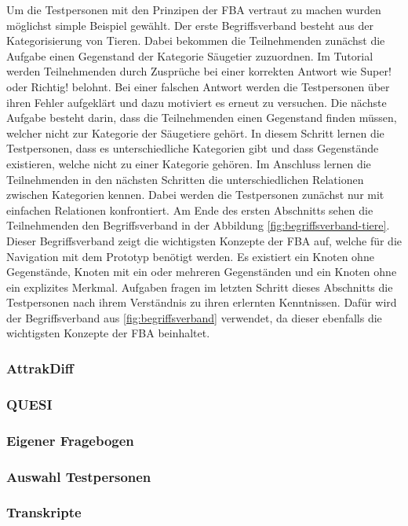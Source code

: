 Um die Testpersonen mit den Prinzipen der \ac{FBA} vertraut zu machen wurden möglichst simple Beispiel gewählt.
Der erste Begriffsverband besteht aus der Kategorisierung von Tieren.
Dabei bekommen die Teilnehmenden zunächst die Aufgabe einen Gegenstand der Kategorie Säugetier zuzuordnen.
Im Tutorial werden Teilnehmenden durch Zusprüche bei einer korrekten Antwort wie \glqq Super!\grqq{} oder \glqq Richtig!\grqq{} belohnt.
Bei einer falschen Antwort werden die Testpersonen über ihren Fehler aufgeklärt und dazu motiviert es erneut zu versuchen.
Die nächste Aufgabe besteht darin, dass die Teilnehmenden einen Gegenstand finden müssen, welcher nicht zur Kategorie der Säugetiere gehört.
In diesem Schritt lernen die Testpersonen, dass es unterschiedliche Kategorien gibt und dass Gegenstände existieren, welche nicht zu einer Kategorie gehören.
Im Anschluss lernen die Teilnehmenden in den nächsten Schritten die unterschiedlichen Relationen zwischen Kategorien kennen.
Dabei werden die Testpersonen zunächst nur mit einfachen Relationen konfrontiert.
Am Ende des ersten Abschnitts sehen die Teilnehmenden den Begriffsverband in der Abbildung \ref{fig:begriffsverband-tiere}.
Dieser Begriffsverband zeigt die wichtigsten Konzepte der \ac{FBA} auf, welche für die Navigation mit dem Prototyp benötigt werden.
Es existiert ein Knoten ohne Gegenstände, Knoten mit ein oder mehreren Gegenständen und ein Knoten ohne ein explizites Merkmal.
Aufgaben fragen im letzten Schritt dieses Abschnitts die Testpersonen nach ihrem Verständnis zu ihren erlernten Kenntnissen.
Dafür wird der Begriffsverband aus \autoref{fig:begriffsverband} verwendet, da dieser ebenfalls die wichtigsten Konzepte der \ac{FBA} beinhaltet.

\subsubsection{AttrakDiff}
\subsubsection{QUESI}
\subsubsection{Eigener Fragebogen}
\subsubsection{Auswahl Testpersonen}
\subsubsection{Transkripte}
